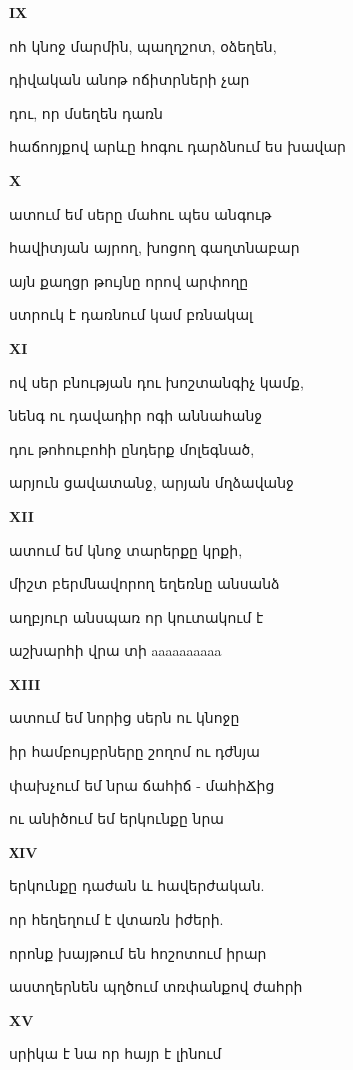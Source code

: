\centerline {\bf IX}

ոհ  կնոջ մարմին, պաղղշոտ, օձեղեն, 




դիվական  անոթ ոճիտրների չար



դու, որ մսեղեն դառն



հաճոոյքով արևը հոգու  դարձնում ես խավար 







\centerline{\bf X}

ատում եմ սերը մահու պես անգութ


հավիտյան այրող, խոցող գաղտնաբար

այն քաղցր թույնը որով արփողը  


ստրուկ է դառնում  կամ բռնակալ 

\centerline {\bf  XI}

ով սեր  բնության  դու խոշտանգիչ կամք,
 

նենգ ու դավադիր ոգի աննահանջ

դու թոհուբոհի ընդերք մոլեգնած,


 արյուն ցավատանջ, արյան մղձավանջ 


\centerline{\bf XII}

  ատում եմ կնոջ տարերքը կրքի,


միշտ բերմնավորող եղեռնը անսանձ


  աղբյուր   անսպառ որ կուտակում է


  աշխարհի վրա տի
aaaaaaaaaa
                           
\centerline{\bf XIII}


ատում եմ  նորից սերն ու կնոջը



   իր համբույբրները շողոմ ու   դժնյա
 

փախչում եմ նրա ճահիճ - մահիՃից 


 ու անիծում եմ երկունքը նրա


\centerline{\bf ХIV}


երկունքը դաժան և հավերժական.


որ հեղեղում է վտառն իժերի.


որոնք խայթում են հոշոտում իրար


աստղերնեն պղծում տռփանքով ժահրի



\centerline{\bf XV}

սրիկա է նա որ հայր է լինում 
  















